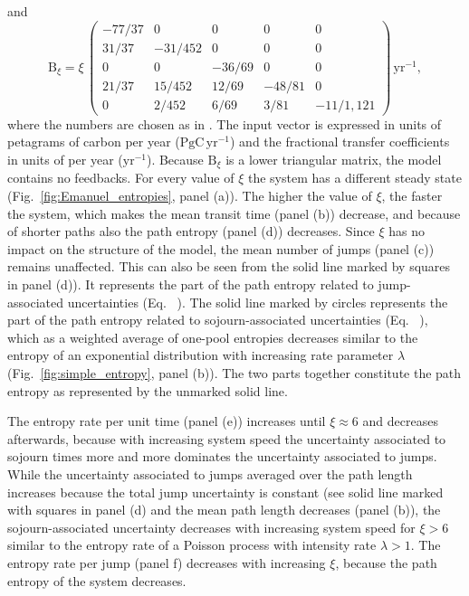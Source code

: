 \documentclass[smallextended]{svjour3}
\makeatletter
\renewcommand*{\eqref}[1]{%
  \hyperref[{#1}]{\textup{\tagform@{\ref*{#1}}}}%
}
\renewcommand{\tens}[1]{\mathrm{#1}}
\newcommand{\peta}{\mathrm{P}}
\newcommand{\gC}{\mathrm{gC}}
\newcommand{\yr}{\mathrm{yr}}
\makeatother
\begin{document}
and
\begin{equation}
    \tens{B}_\xi = \xi\,\left(\begin{matrix}
      -77/37 &       0 &      0 &      0 & 	  0\\
       31/37 & -31/452 &      0 &      0 & 	  0\\
	   0 &       0 & -36/69 &      0 & 	  0\\
       21/37 &  15/452 &  12/69 & -48/81 & 	  0\\
	   0 &   2/452 &   6/69 &   3/81 & -11/1,121
	 \end{matrix}\right)\,\yr^{-1},
\end{equation}
where the numbers are chosen as in \citet{Thompson1999GCB}. 
The input vector is expressed in units of petagrams of carbon per year ($\peta\gC\,\yr^{-1}$) and the fractional transfer coefficients in units of per year ($\yr^{-1}$).
Because $\tens{B}_\xi$ is a lower triangular matrix, the model contains no feedbacks.
For every value of $\xi$ the system has a different steady state (Fig.~\ref{fig:Emanuel_entropies}, panel (a)).
The higher the value of $\xi$, the faster the system, which makes the mean transit time (panel (b)) decrease, and because of shorter paths also the path entropy (panel (d)) decreases.
Since $\xi$ has no impact on the structure of the model, the mean number of jumps (panel (c)) remains unaffected.
This can also be seen from the solid line marked by squares in panel (d)).
It represents the part of the path entropy related to jump-associated uncertainties (Eq.~\eqref{eqn:H_discrete}).
The solid line marked by circles represents the part of the path entropy related to sojourn-associated uncertainties (Eq.~\eqref{eqn:H_continuous}), which as a weighted average of one-pool entropies decreases similar to the entropy of an exponential distribution with increasing rate parameter $\lambda$ (Fig.~\ref{fig:simple_entropy}, panel (b)).
The two parts together constitute the path entropy as represented by the unmarked solid line.

The entropy rate per unit time (panel (e)) increases until $\xi\approx6$ and decreases afterwards, because with increasing system speed the uncertainty associated to sojourn times more and more dominates the uncertainty associated to jumps.
While the uncertainty associated to jumps averaged over the path length increases because the total jump uncertainty is constant (see solid line marked with squares in panel (d) and the mean path length decreases (panel (b)), the sojourn-associated uncertainty decreases with increasing system speed for $\xi>6$ similar to the entropy rate of a Poisson process with intensity rate $\lambda>1$.
The entropy rate per jump (panel f) decreases with increasing $\xi$, because the path entropy of the system decreases.
\end{document}
